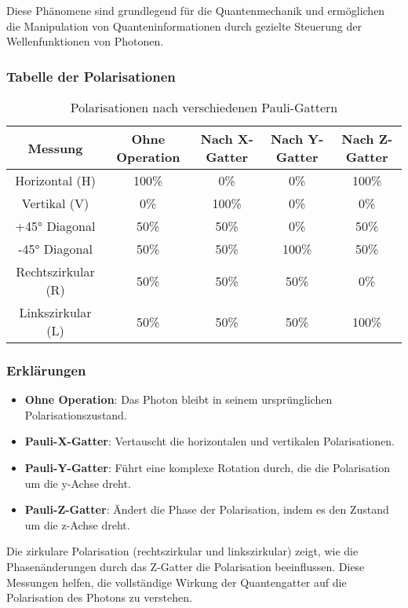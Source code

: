 \documentclass[12pt,a4paper]{article}
\begin{document}
	Diese Phänomene sind grundlegend für die Quantenmechanik und ermöglichen die Manipulation von Quanteninformationen durch gezielte Steuerung der Wellenfunktionen von Photonen.
	
	\subsubsection{Tabelle der Polarisationen}
	
	
	\begin{table}[h!]
		\centering
		\small %
		\begin{tabular}{|c|c|c|c|c|}
			\hline
			\textbf{Messung} & \textbf{Ohne Operation} & \textbf{Nach X-Gatter} & \textbf{Nach Y-Gatter} & \textbf{Nach Z-Gatter} \\
			\hline
			Horizontal (H) & 100\% & 0\% & 0\% & 100\% \\
			\hline
			Vertikal (V) & 0\% & 100\% & 0\% & 0\% \\
			\hline
			+45° Diagonal & 50\% & 50\% & 0\% & 50\% \\
			\hline
			-45° Diagonal & 50\% & 50\% & 100\% & 50\% \\
			\hline
			Rechtszirkular (R) & 50\% & 50\% & 50\% & 0\% \\
			\hline
			Linkszirkular (L) & 50\% & 50\% & 50\% & 100\% \\
			\hline
		\end{tabular}
		\caption{Polarisationen nach verschiedenen Pauli-Gattern}
	\end{table}
	
	
	
	
	\subsubsection{Erklärungen}
	\begin{itemize}
		\item \textbf{Ohne Operation}: Das Photon bleibt in seinem ursprünglichen Polarisationszustand.
		\item \textbf{Pauli-X-Gatter}: Vertauscht die horizontalen und vertikalen Polarisationen.
		\item \textbf{Pauli-Y-Gatter}: Führt eine komplexe Rotation durch, die die Polarisation um die y-Achse dreht.
		\item \textbf{Pauli-Z-Gatter}: Ändert die Phase der Polarisation, indem es den Zustand um die z-Achse dreht.
	\end{itemize}
	
	Die zirkulare Polarisation (rechtszirkular und linkszirkular) zeigt, wie die Phasenänderungen durch das Z-Gatter die Polarisation beeinflussen. Diese Messungen helfen, die vollständige Wirkung der Quantengatter auf die Polarisation des Photons zu verstehen.
	
\end{document}
